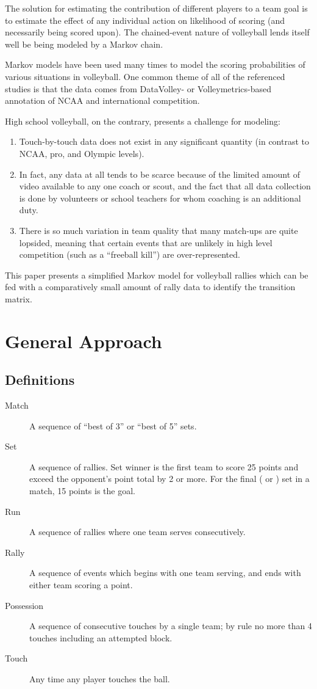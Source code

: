 \documentclass{IOS-Book-Article}
\begin{document}
The solution for estimating the contribution of different players to a team goal is to
estimate the effect of any individual action on likelihood of scoring (and necessarily being 
scored upon). The chained-event nature of volleyball lends itself well be being modeled by a 
Markov chain.

Markov models have been used many times to model the scoring probabilities of various 
situations in volleyball. \cite{xu, flo, aldous} One common theme of all of the referenced studies 
is that the data comes from DataVolley- or Volleymetrics-based annotation of NCAA and international competition.

High school volleyball, on the contrary, presents a challenge for modeling:
\begin{enumerate}
    \item Touch-by-touch data does not exist in any significant quantity (in contrast to NCAA, pro,
    and Olympic levels).
    \item In fact, any data at all tends to be scarce because of the limited amount of video 
    available to any one coach or scout, and the fact that all data collection is done by volunteers
    or school teachers for whom coaching is an additional duty.
    \item There is so much variation in team quality that many match-ups are quite lopsided, meaning
    that certain events that are unlikely in high level competition (such as a ``freeball kill'') 
    are over-represented. 
\end{enumerate}

This paper presents a simplified Markov model for volleyball rallies which can be fed with a comparatively small amount of rally data to identify the transition matrix.

\section{General Approach}

\subsection{Definitions}

\begin{description}
\item [Match] A sequence of ``best of 3'' or ``best of 5'' sets.
\item [Set] A sequence of rallies. Set winner is the first team to score 25 points and exceed the
opponent's point total by 2 or more. For the final ( or ) set in a match, 15 points
is the goal.
\item [Run] A sequence of rallies where one team serves consecutively.
\item [Rally] A sequence of events which begins with one team serving, and ends with either team
scoring a point.
\item [Possession] A sequence of consecutive touches by a single team; by rule no more than 4
touches including an attempted block.
\item [Touch] Any time any player touches the ball.
\end{description}
\end{document}
